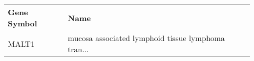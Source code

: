 \begin{tabular}{ll}
\toprule
Gene Symbol &                                               Name \\
\midrule
      MALT1 & mucosa associated lymphoid tissue lymphoma tran... \\
\bottomrule
\end{tabular}
